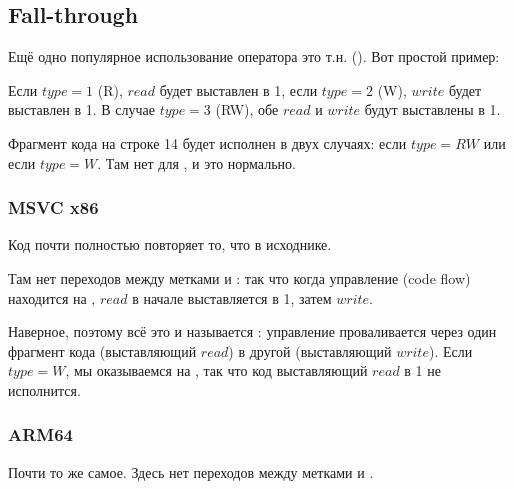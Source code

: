 ﻿\subsection{Fall-through}

Ещё одно популярное использование оператора  это т.н.  ().
Вот простой пример:



Если $type=1$ (R), $read$ будет выставлен в 1, если $type=2$ (W), $write$ будет выставлен в 1.
В случае $type=3$ (RW), обе $read$ и $write$ будут выставлены в 1.

Фрагмент кода на строке 14 будет исполнен в двух случаях: если $type=RW$ или если $type=W$.
Там нет  для , и это нормально.

\subsubsection{MSVC x86}



Код почти полностью повторяет то, что в исходнике.

Там нет переходов между метками  и 
: так что когда управление (code flow) находится на 
, $read$ в начале выставляется в 1, затем $write$.

Наверное, поэтому всё это и называется : управление проваливается через
один фрагмент кода (выставляющий $read$) в другой (выставляющий $write$).
Если $type=W$, мы оказываемся на , 
так что код выставляющий $read$ в 1 не исполнится.

\subsubsection{ARM64}



Почти то же самое.
Здесь нет переходов между метками  и .


